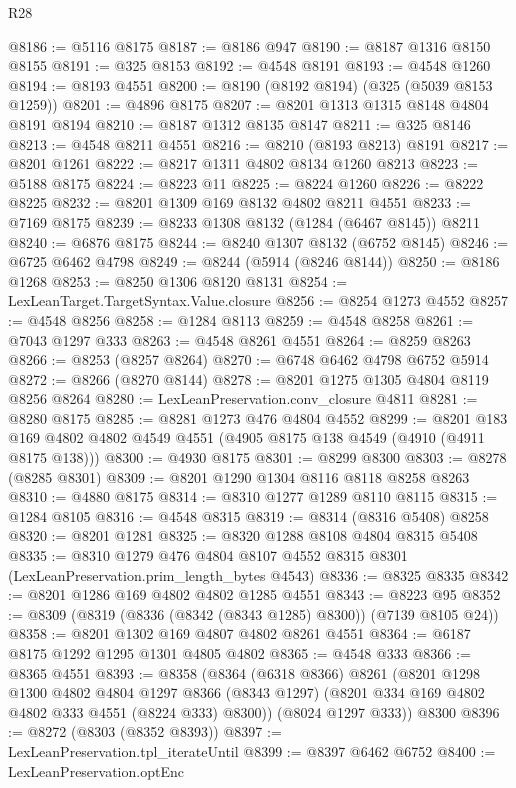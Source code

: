 \begin{lexlean}{R28}
\begin{coremodule}
@8186 := @5116 @8175
@8187 := @8186 @947
@8190 := @8187 @1316 @8150 @8155
@8191 := @325 @8153
@8192 := @4548 @8191
@8193 := @4548 @1260
@8194 := @8193 @4551
@8200 := @8190 (@8192 @8194) (@325 (@5039 @8153 @1259))
@8201 := @4896 @8175
@8207 := @8201 @1313 @1315 @8148 @4804 @8191 @8194
@8210 := @8187 @1312 @8135 @8147
@8211 := @325 @8146
@8213 := @4548 @8211 @4551
@8216 := @8210 (@8193 @8213) @8191
@8217 := @8201 @1261
@8222 := @8217 @1311 @4802 @8134 @1260 @8213
@8223 := @5188 @8175
@8224 := @8223 @11
@8225 := @8224 @1260
@8226 := @8222 @8225
@8232 := @8201 @1309 @169 @8132 @4802 @8211 @4551
@8233 := @7169 @8175
@8239 := @8233 @1308 @8132 (@1284 (@6467 @8145)) @8211
@8240 := @6876 @8175
@8244 := @8240 @1307 @8132 (@6752 @8145)
@8246 := @6725 @6462 @4798
@8249 := @8244 (@5914 (@8246 @8144))
@8250 := @8186 @1268
@8253 := @8250 @1306 @8120 @8131
@8254 := LexLeanTarget.TargetSyntax.Value.closure
@8256 := @8254 @1273 @4552
@8257 := @4548 @8256
@8258 := @1284 @8113
@8259 := @4548 @8258
@8261 := @7043 @1297 @333
@8263 := @4548 @8261 @4551
@8264 := @8259 @8263
@8266 := @8253 (@8257 @8264)
@8270 := @6748 @6462 @4798 @6752 @5914
@8272 := @8266 (@8270 @8144)
@8278 := @8201 @1275 @1305 @4804 @8119 @8256 @8264
@8280 := LexLeanPreservation.conv_closure @4811
@8281 := @8280 @8175
@8285 := @8281 @1273 @476 @4804 @4552
@8299 := @8201 @183 @169 @4802 @4802 @4549 @4551 (@4905 @8175 @138 @4549 (@4910 (@4911 @8175 @138)))
@8300 := @4930 @8175
@8301 := @8299 @8300
@8303 := @8278 (@8285 @8301)
@8309 := @8201 @1290 @1304 @8116 @8118 @8258 @8263
@8310 := @4880 @8175
@8314 := @8310 @1277 @1289 @8110 @8115
@8315 := @1284 @8105
@8316 := @4548 @8315
@8319 := @8314 (@8316 @5408) @8258
@8320 := @8201 @1281
@8325 := @8320 @1288 @8108 @4804 @8315 @5408
@8335 := @8310
    @1279
    @476
    @4804
    @8107
    @4552
    @8315
    @8301
    (LexLeanPreservation.prim_length_bytes @4543)
@8336 := @8325 @8335
@8342 := @8201 @1286 @169 @4802 @4802 @1285 @4551
@8343 := @8223 @95
@8352 := @8309 (@8319 (@8336 (@8342 (@8343 @1285) @8300)) (@7139 @8105 @24))
@8358 := @8201 @1302 @169 @4807 @4802 @8261 @4551
@8364 := @6187 @8175 @1292 @1295 @1301 @4805 @4802
@8365 := @4548 @333
@8366 := @8365 @4551
@8393 := @8358
    (@8364
      (@6318 @8366)
      @8261
      (@8201
        @1298
        @1300
        @4802
        @4804
        @1297
        @8366
        (@8343 @1297)
        (@8201 @334 @169 @4802 @4802 @333 @4551 (@8224 @333) @8300))
      (@8024 @1297 @333))
    @8300
@8396 := @8272 (@8303 (@8352 @8393))
@8397 := LexLeanPreservation.tpl_iterateUntil
@8399 := @8397 @6462 @6752
@8400 := LexLeanPreservation.optEnc

\end{coremodule}
\end{lexlean}
